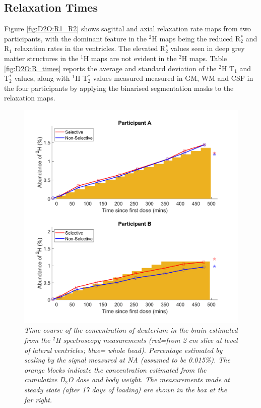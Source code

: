 \subsection{Relaxation Times}

Figure \ref{fig:D2O:R1_R2} shows sagittal and axial relaxation rate maps from two participants, with the dominant feature in the $^2$H maps being the reduced R$_2^*$ and R$_1$ relaxation rates in the ventricles. The elevated R$_2^*$ values seen in deep grey matter structures in the $^1$H maps are not evident in the $^2$H maps. Table \ref{fig:D2O:R_times} reports the average and standard deviation of the $^2$H T$_1$ and T$_2^*$ values, along with $^1$H T$_2^*$ values measured measured in \ac{GM}, \ac{WM} and \ac{CSF} in the four participants by applying the binarised segmentation masks to the relaxation maps.

\begin{figure}[H]
    \centering
    \includegraphics[width=1\textwidth]{Figures/D2O/Bulk_Graph.png}
    \caption{\textit{Time course of the concentration of deuterium in the brain estimated from the $^2$H spectroscopy measurements (red=from 2 cm slice at level of lateral ventricles; blue= whole head). Percentage estimated by scaling by the signal measured at \ac{NA} (assumed to be 0.015\%). The orange blocks indicate the concentration estimated from the cumulative D$_2$O dose and body weight. The measurements made at steady state (after 17 days of loading) are shown in the box at the far right.}}
    \label{fig:D2O:Bulk}
\end{figure}

